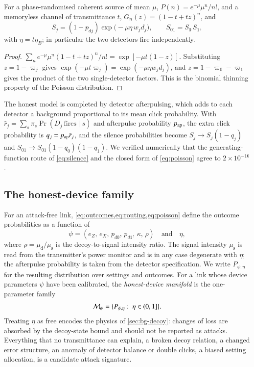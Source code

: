 \begin{proposition}\label{prop:poisson}
For a phase-randomised coherent source of mean $\mu$, $P(n)=e^{-\mu}\mu^n/n!$, and a memoryless channel of transmittance $t$, $G_n(z)=(1-t+tz)^n$, and
\begin{equation}
S_j=(1-p_{dj})\exp\!\bigl(-\mu\eta\, w_j d_j\bigr),\qquad S_{01}=S_0\,S_1, \label{eq:poisson}
\end{equation}
with $\eta=t\eta_B$; in particular the two detectors fire independently.
\end{proposition}
\begin{proof}
$\sum_n e^{-\mu}\mu^n(1-t+tz)^n/n! = \exp[-\mu t(1-z)]$. Substituting $z=1-\varpi_j$ gives $\exp(-\mu t\varpi_j)=\exp(-\mu\eta w_jd_j)$, and $z=1-\varpi_0-\varpi_1$ gives the product of the two single-detector factors. This is the binomial thinning property of the Poisson distribution.
\end{proof}

The honest model is completed by detector afterpulsing, which adds to each detector a background proportional to its mean click probability. With $\bar r_j=\sum_s\pi_s\Pr(D_j\ \text{fires}\mid s)$ and afterpulse probability $p_{\rm ap}$, the extra click probability is $q_j=p_{\rm ap}\bar r_j$, and the silence probabilities become $S_j\to S_j(1-q_j)$ and $S_{01}\to S_{01}(1-q_0)(1-q_1)$. We verified numerically that the generating-function route of \cref{eq:silence} and the closed form of \cref{eq:poisson} agree to $2\times10^{-16}$.

\subsection{The honest-device family}\label{sec:family}

For an attack-free link, \cref{eq:outcomes,eq:routing,eq:poisson} define the outcome probabilities as a function of
\begin{equation}
\psi=(e_Z,\,e_X,\,p_{d0},\,p_{d1},\,\kappa,\,\rho)\quad\text{and}\quad \eta, \label{eq:params}
\end{equation}
where $\rho=\mu_\mathrm{d}/\mu_\mathrm{s}$ is the decoy-to-signal intensity ratio. The signal intensity $\mu_\mathrm{s}$ is read from the transmitter's power monitor and is in any case degenerate with $\eta$; the afterpulse probability is taken from the detector specification. We write $P_{\psi,\eta}$ for the resulting distribution over settings and outcomes. For a link whose device parameters $\psi$ have been calibrated, the \emph{honest-device manifold} is the one-parameter family
\begin{equation}
\mathcal{M}_\psi = \{P_{\psi,\eta}:\ \eta\in(0,1]\}. \label{eq:manifold}
\end{equation}
Treating $\eta$ as free encodes the physics of \cref{sec:bg-decoy}: changes of loss are absorbed by the decoy-state bound and should not be reported as attacks. Everything that no transmittance can explain, a broken decoy relation, a changed error structure, an anomaly of detector balance or double clicks, a biased setting allocation, is a candidate attack signature.

